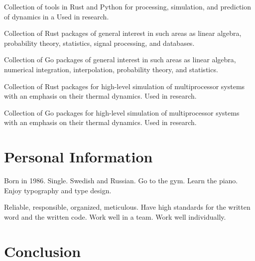 \documentclass[journal]{IEEEtran}
\begin{document}
\emph{}

Collection of tools in Rust and Python for processing, simulation, and
prediction of dynamics in a
 Used in
research.

\emph{}

Collection of Rust packages of general interest in such areas as linear algebra,
probability theory, statistics, signal processing, and databases.

\emph{}

Collection of Go packages of general interest in such areas as linear algebra,
numerical integration, interpolation, probability theory, and statistics.

\emph{}

Collection of Rust packages for high-level simulation of multiprocessor systems
with an emphasis on their thermal dynamics. Used in research.

\emph{}

Collection of Go packages for high-level simulation of multiprocessor systems
with an emphasis on their thermal dynamics. Used in research.

\section{Personal Information}

Born in 1986. Single. Swedish and Russian. Go to the gym.
 Learn the piano.
Enjoy typography and type design.

Reliable, responsible, organized, meticulous. Have high standards for the
written word and the written code. Work well in a team. Work well individually.

\section{Conclusion}

\begingroup
  
  
\endgroup
\end{document}
